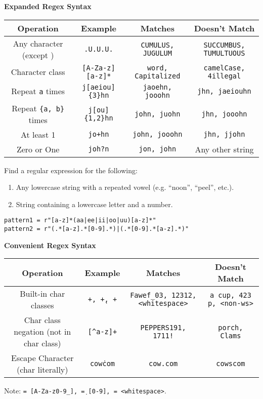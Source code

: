 \textbf{Expanded Regex Syntax}
\begin{center}
\begin{tabular}{@{}cccc@{}}
\toprule
    Operation & Example & Matches & Doesn't Match \\
\midrule
    Any character (except \texttt{\n}) & \texttt{.U.U.U.} & \texttt{CUMULUS, JUGULUM} & \texttt{SUCCUMBUS, TUMULTUOUS} \\
    Character class & \texttt{[A-Za-z][a-z]*} & \texttt{word, Capitalized} & \texttt{camelCase, 4illegal} \\
    Repeat \texttt{a} times & \texttt{j[aeiou]\{3\}hn} & \texttt{jaoehn, jooohn} & \texttt{jhn, jaeiouhn}  \\
    Repeat \texttt{\{a, b\}} times & \texttt{j[ou]\{1,2\}hn} & \texttt{john, juohn} & \texttt{jhn, jooohn} \\
    At least 1 & \texttt{jo+hn} & \texttt{john, jooohn} & \texttt{jhn, jjohn} \\
    Zero or One & \texttt{joh?n} & \texttt{jon, john} & Any other string \\
\bottomrule
\end{tabular}
\end{center}

\begin{example}[]{Find a regular expression for the following:
\begin{enumerate}
\item Any lowercase string with a repeated vowel (e.g. ``noon'', ``peel'', etc.).
\item String containing a lowercase letter and a number.
\end{enumerate}
\tcbline 
\begin{verbatim}
pattern1 = r"[a-z]*(aa|ee|ii|oo|uu)[a-z]*"
pattern2 = r"(.*[a-z].*[0-9].*)|(.*[0-9].*[a-z].*)"
\end{verbatim}
}
\end{example}

\textbf{Convenient Regex Syntax}
\begin{center}
\begin{tabular}{@{}cccc@{}}
\toprule
    Operation & Example & Matches & Doesn't Match \\
\midrule
    Built-in char classes & \texttt{\w+, \d+, \s+} & \texttt{Fawef_03, 12312, <whitespace>} & \texttt{a cup, 423 p, <non-ws>} \\
    Char class negation (not in char class) & \texttt{[^a-z]+} & \texttt{PEPPERS191, 1711!} & \texttt{porch, Clams} \\
    Escape Character (char literally) & \texttt{cow\.com} & \texttt{cow.com} & \texttt{cowscom} \\
\bottomrule
\end{tabular}
\end{center}
Note: \texttt{\w = [A-Za-z0-9_], \d = [0-9], \s = <whitespace>}.

